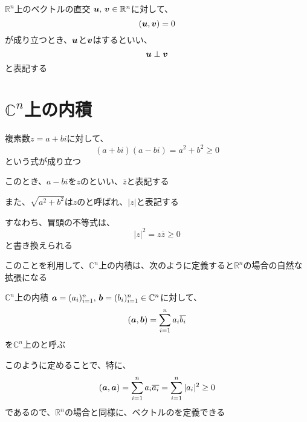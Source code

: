 \documentclass[../../../topic_linear-algebra]{subfiles}
\begin{document}
\begin{definition}{$\mathbb{R}^n$上のベクトルの直交}
  $\vb*{u},\,\vb*{v} \in \mathbb{R}^n$に対して、
  \begin{equation*}
    (\vb*{u}, \vb*{v}) = 0
  \end{equation*}
  が成り立つとき、$\vb*{u}$と$\vb*{v}$はするといい、
  \begin{equation*}
    \vb*{u} \perp \vb*{v}
  \end{equation*}
  と表記する
\end{definition}

\sectionline
\section{$\mathbb{C}^n$上の内積}

複素数$z=a+bi$に対して、
\begin{equation*}
  (a+bi)(a-bi) = a^2 + b^2 \geq 0
\end{equation*}
という式が成り立つ

このとき、$a-bi$を$z$のといい、$\overline{z}$と表記する

また、$\sqrt{a^2 + b^2}$は$z$のと呼ばれ、$|z|$と表記する

\br

すなわち、冒頭の不等式は、
\begin{equation*}
  |z|^2 = z \overline{z} \geq 0
\end{equation*}
と書き換えられる

\br

このことを利用して、$\mathbb{C}^n$上の内積は、次のように定義すると$\mathbb{R}^n$の場合の自然な拡張になる

\begin{definition}{$\mathbb{C}^n$上の内積}
  $\vb*{a} = (a_i)_{i=1}^n,\, \vb*{b} = (b_i)_{i=1}^n \in \mathbb{C}^n$に対して、
  \begin{equation*}
    (\vb*{a}, \vb*{b}) = \sum_{i=1}^n a_i \overline{b_i}
  \end{equation*}
  を$\mathbb{C}^n$上のと呼ぶ
\end{definition}

このように定めることで、特に、
\begin{equation*}
  (\vb*{a}, \vb*{a}) = \sum_{i=1}^n a_i \overline{a_i} = \sum_{i=1}^n |a_i|^2 \geq 0
\end{equation*}
であるので、$\mathbb{R}^n$の場合と同様に、ベクトルのを定義できる
\end{document}
